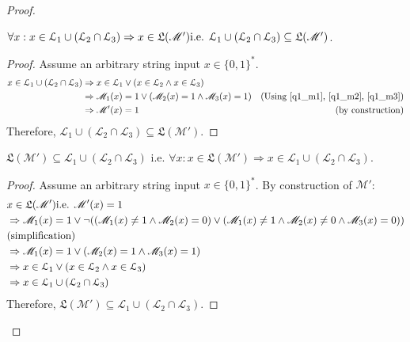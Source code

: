 \documentclass[usletter]{article}
\newcommand {\langset}[1]      {\ensuremath{\mathcal{#1}}}
\newcommand {\machine}[1]      {\ensuremath{\mathscr{#1}}}
\newcommand {\langfunc}        {\ensuremath{\mathfrak{L}}}
\newcommand{\ie}{\textnormal{i.e. }}
\newcommand {\langL}          {\langset{L}}
\newcommand {\machineM}       {\machine{M}}
\newcommand {\allstrings}     {\ensuremath{\{0,1\}^*}}
\begin{document}
\begin{enumerate}
\begin{proof}
    \begin{claim}
      $\forall x : x \in \langL_1 \cup (\langL_2 \cap \langL_3)
                  \Rightarrow x \in \langfunc(\machineM') \ie
        \langL_1 \cup (\langL_2 \cap \langL_3) \subseteq \langfunc(\machineM')$.
    \end{claim}
    \begin{proof}
      Assume an arbitrary string input $x \in \allstrings$.
      \begin{align*}
        x \in \langL_1 \cup (\langL_2 \cap \langL_3)
          &\Rightarrow x \in \langL_1
              \vee (x \in \langL_2 \wedge x \in \langL_3) \\
          &\Rightarrow \machineM_1(x) = 1
            \vee (\machineM_2(x) = 1 \wedge \machineM_3(x) = 1)
            & \textnormal{(Using \ref{q1_m1}, \ref{q1_m2}, \ref{q1_m3})} \\
          &\Rightarrow \machineM'(x) = 1 & \textnormal{(by construction)}
      \end{align*}
      Therefore,
      $\langL_1 \cup (\langL_2 \cap \langL_3) \subseteq \langfunc(\machineM')$.
    \end{proof}

    \begin{claim}
      $\langfunc(\machineM') \subseteq \langL_1 \cup (\langL_2 \cap \langL_3)$
      \ie $\forall x : x \in \langfunc(\machineM')
                      \Rightarrow x \in \langL_1 \cup (\langL_2 \cap \langL_3)$.
    \end{claim}
    \begin{proof}
      Assume an arbitrary string input $x \in \allstrings$.
      By construction of $\machineM'$:
      \begin{align*}
        &x \in \langfunc(\machineM') \ie \machineM'(x) = 1 \\
        &\Rightarrow \machineM_1(x) = 1
          \vee \neg ((\machineM_1(x) \neq 1 \wedge \machineM_2(x) = 0)
                     \vee (\machineM_1(x) \neq 1 \wedge \machineM_2(x) \neq 0
                                                 \wedge \machineM_3(x) = 0)) \\
        &\textnormal{(simplification)} \\
        &\Rightarrow \machineM_1(x) = 1
          \vee (\machineM_2(x) = 1 \wedge \machineM_3(x) = 1) \\
        &\Rightarrow x \in \langL_1
          \vee (x \in \langL_2 \wedge x \in \langL_3) \\
        &\Rightarrow x \in \langL_1 \cup (\langL_2 \cap \langL_3)
      \end{align*}
      Therefore,
      $\langfunc(\machineM') \subseteq \langL_1 \cup (\langL_2 \cap \langL_3)$.
    \end{proof}


\end{proof}
\end{enumerate}
\end{document}
